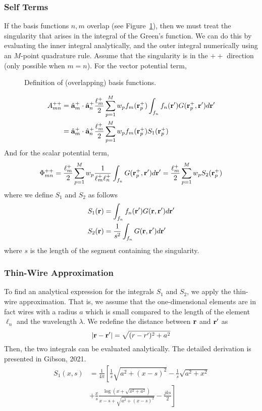 \subsubsection{Self Terms}
If the basis functions $n, m$ overlap (see Figure~\ref{fig:mom_basis3}), then we must treat the singularity that arises in the integral of the Green's function. We can do this by evaluating the inner integral analytically, and the outer integral numerically using an $M$-point quadrature rule. Assume that the singularity is in the $++$ direction (only possible when $m = n$). For the vector potential term,
\begin{figure}[t]
	\centering
	
	\caption{Definition of (overlapping) basis functions.}
	\label{fig:mom_basis3}
\end{figure}
\begin{align*}
	A_{mn}^{++} & = \hat{\mathbf{a}}_m^{+} \cdot \hat{\mathbf{a}}_n^{+} \frac{\ell_m^+}{2} \sum_{p = 1}^M w_p f_m(\mathbf{r}_p^+) \int_{f_n} f_n(\mathbf{r}^\prime) G(\mathbf{r}_p^+, \mathbf{r}^\prime) d\mathbf{r}^\prime \\
	& = \hat{\mathbf{a}}_m^{+} \cdot \hat{\mathbf{a}}_n^{+} \frac{\ell_m^+}{2} \sum_{p = 1}^M w_p f_m(\mathbf{r}_p^+) S_1(\mathbf{r}_p^+)
\end{align*}
And for the scalar potential term,
\begin{equation*}
	\Phi_{mn}^{++} = \frac{\ell_m^+}{2} \sum_{p = 1}^M w_p \frac{1}{\ell_m^+ \ell_n^+} \int_{f_n} G(\mathbf{r}_p^+, \mathbf{r}^\prime) d\mathbf{r}^\prime = \frac{\ell_m^+}{2} \sum_{p = 1}^M w_p S_2(\mathbf{r}_p^+)
\end{equation*}
where we define $S_1$ and $S_2$ as follows
\begin{align}
	S_1(\mathbf{r}) & = \int_{f_n} f_n(\mathbf{r}^\prime) G(\mathbf{r}, \mathbf{r}^\prime) d\mathbf{r}^\prime \\
	S_2(\mathbf{r}) & = \frac{1}{s^2} \int_{f_n} G(\mathbf{r}, \mathbf{r}^\prime) d\mathbf{r}^\prime
\end{align}
where $s$ is the length of the segment containing the singularity. 

\subsubsection{Thin-Wire Approximation}
To find an analytical expression for the integrals $S_1$ and $S_2$, we apply the thin-wire approximation. That is, we assume that the one-dimensional elements are in fact wires with a radius $a$ which is small compared to the length of the element $\ell_n$ and the wavelength $\lambda$. We redefine the distance between $\mathbf{r}$ and $\mathbf{r}^\prime$ as
\begin{equation*}
	|\mathbf{r} - \mathbf{r}^\prime| = \sqrt{(r - r^\prime)^2 + a^2}
\end{equation*}
Then, the two integrals can be evaluated analytically. The detailed derivation is presented in Gibson, 2021.
\begin{equation}
	\begin{aligned}
		S_1(x, s) & = \frac{1}{4\pi} \left[ \frac{1}{s} \sqrt{a^2 + (x - s)^2} - \frac{1}{s} \sqrt{a^2 + x^2} \right. \\
		 & + \left. \frac{x}{s} \frac{\log\left( x + \sqrt{x^2 + a^2} \right)}{x - s + \sqrt{a^2 + (x - s)^2}} - \frac{j k s}{2} \right]
	\end{aligned}
\end{equation}

